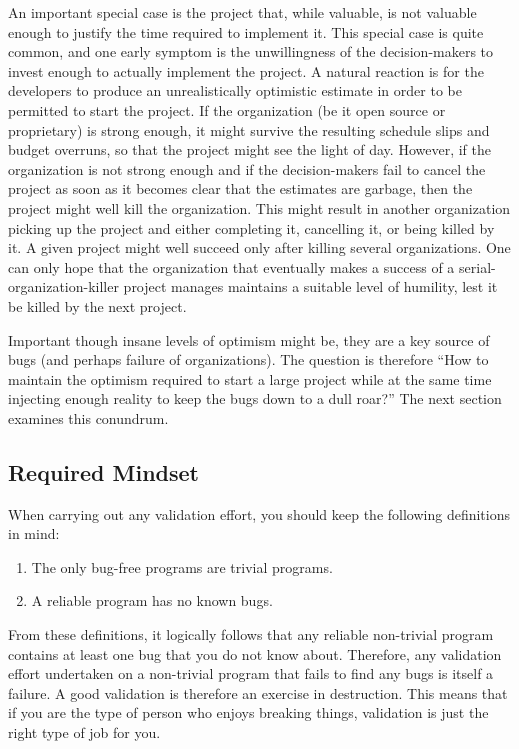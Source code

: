 An important special case is the project that, while valuable, is not
valuable enough to justify the time required to implement it.
This special case is quite common, and one early symptom is the
unwillingness of the decision-makers to invest enough to actually
implement the project.
A natural reaction is for the developers to produce an unrealistically
optimistic estimate in order to be permitted to start the project.
If the organization (be it open source or proprietary) is strong enough,
it might survive the resulting schedule slips and budget overruns,
so that the project might see the light of day.
However, if the organization is not strong enough and if the decision-makers
fail to cancel the project as soon as it becomes clear that the estimates
are garbage, then the project might well kill the organization.
This might result in another organization picking up the project and
either completing it, cancelling it, or being killed by it.
A given project might well succeed only after killing several
organizations.
One can only hope that the organization that eventually makes a success
of a serial-organization-killer project manages maintains a suitable
level of humility, lest it be killed by the next project.

Important though insane levels of optimism might be, they are a key source
of bugs (and perhaps failure of organizations).
The question is therefore ``How to maintain the optimism required to start
a large project while at the same time injecting enough reality to keep
the bugs down to a dull roar?''
The next section examines this conundrum.

\subsection{Required Mindset}
\label{sec:debugging:Required Mindset}

When carrying out any validation effort, you should keep the following
definitions in mind:

\begin{enumerate}
\item	The only bug-free programs are trivial programs.
\item	A reliable program has no known bugs.
\end{enumerate}

From these definitions, it logically follows that any reliable
non-trivial program contains at least one bug that you do not
know about.
Therefore, any validation effort undertaken on a non-trivial program
that fails to find any bugs is itself a failure.
A good validation is therefore an exercise in destruction.
This means that if you are the type of person who enjoys breaking things,
validation is just the right type of job for you.

